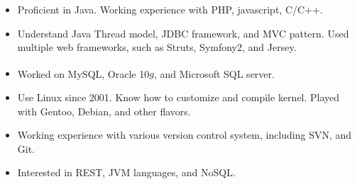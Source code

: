 \documentclass{harnon-cv}
\begin{document}
\maketitle

\begin{itemize}\itemsep1pt
\item Proficient in Java. Working experience with PHP, javascript, C/C++.
\item Understand Java Thread model, JDBC framework, and MVC pattern. Used multiple web frameworks, such as Struts, Symfony2, and Jersey.
\item Worked on MySQL\texttrademark, Oracle\textsuperscript{\textregistered} 10$g$, and Microsoft\textsuperscript{\textregistered} SQL server.
\item Use Linux since 2001. Know how to customize and compile kernel. Played with Gentoo, Debian, and other flavors.
\item Working experience with various version control system, including SVN, and Git.
\item Interested in REST, JVM languages, and NoSQL.
\end{itemize}\par
\end{document}
